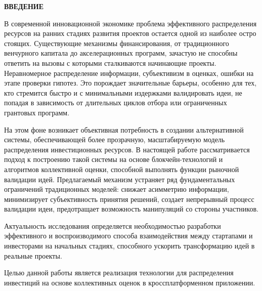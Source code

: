 \documentclass[
    14pt,
    specialist,
    candidate, %
    subf, %
    href,
    dotsinheaders=false
]{disser}
\newcommand{\myunnumberedchapter}[1]{%
  \newpage
  \hypertarget{chap:#1}{}%
  \begin{center}
    \textbf{\MakeUppercase{#1}}
  \end{center}
  \addcontentsline{toc}{chapter}{\texorpdfstring{#1}{#1}}%
}
\begin{document}
\sloppy



\renewcommand{\contentsname}{\centerline{\normalsize\bfseries\centerline{\textbf{\MakeUppercase{СОДЕРЖАНИЕ}}}}}
\setcounter{tocdepth}{1}

\tableofcontents

\myunnumberedchapter{ВВЕДЕНИЕ}

В современной инновационной экономике проблема эффективного распределения ресурсов на ранних стадиях развития проектов остается одной из наиболее остро стоящих. Существующие механизмы финансирования, от традиционного венчурного капитала до акселерационных программ, зачастую не способны ответить на вызовы с которыми сталкиваются начинающие проекты. Неравномерное распределение информации, субъективизм в оценках, ошибки на этапе проверки гипотез. Это порождает значительные барьеры, особенно для тех, кто стремится быстро и с минимальными издержками валидировать идеи, не попадая в зависимость от длительных циклов отбора или ограниченных грантовых программ.

На этом фоне возникает объективная потребность в создании альтернативной системы, обеспечивающей более прозрачную, масштабируемую модель распределения инвестиционных ресурсов. В настоящей работе рассматривается подход к построению такой системы на основе блокчейн-технологий и алгоритмов коллективной оценки, способной выполнять функции рыночной валидации идей. Предлагаемый механизм устраняет ряд фундаментальных ограничений традиционных моделей: снижает асимметрию информации, минимизирует субъективность принятия решений, создает непрерывный процесс валидации идеи, предотращает возможность манипуляций со стороны участников.

Актуальность исследования определяется необходимостью разработки эффективного и воспроизводимого способа взаимодействия между стартапами и инвесторами на начальных стадиях, способного ускорить трансформацию идей в реальные проекты.

Целью данной работы является реализация технологии для распределения инвестиций на основе коллективных оценок в кроссплатформенном приложении.
\end{document}
